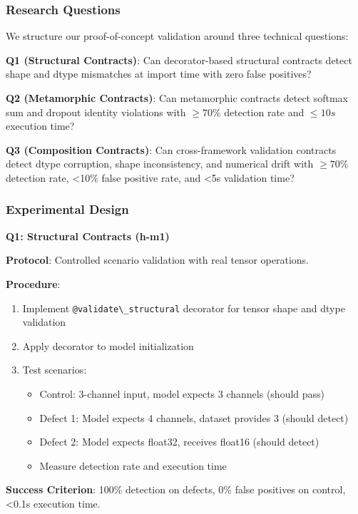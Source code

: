 
\subsubsection{Research Questions}

We structure our proof-of-concept validation around three technical questions:

\textbf{Q1 (Structural Contracts)}: Can decorator-based structural contracts detect shape and dtype mismatches at import time with zero false positives?

\textbf{Q2 (Metamorphic Contracts)}: Can metamorphic contracts detect softmax sum and dropout identity violations with $\geq 70$\% detection rate and $\leq 10s$ execution time?

\textbf{Q3 (Composition Contracts)}: Can cross-framework validation contracts detect dtype corruption, shape inconsistency, and numerical drift with $\geq 70$\% detection rate, <10\% false positive rate, and <5s validation time?

\subsubsection{Experimental Design}

\textbf{Q1: Structural Contracts (h-m1)}

\textbf{Protocol}: Controlled scenario validation with real tensor operations.

\textbf{Procedure}:
\begin{enumerate}
\item Implement \texttt{@validate\textbackslash \_structural} decorator for tensor shape and dtype validation
\item Apply decorator to model initialization
\item Test scenarios:
\begin{itemize}
\item Control: 3-channel input, model expects 3 channels (should pass)
\item Defect 1: Model expects 4 channels, dataset provides 3 (should detect)
\item Defect 2: Model expects float32, receives float16 (should detect)
\item Measure detection rate and execution time
\end{itemize}
\end{enumerate}

\textbf{Success Criterion}: 100\% detection on defects, 0\% false positives on control, <0.1s execution time.

